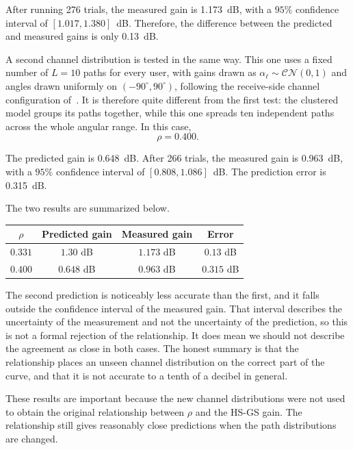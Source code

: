 \documentclass[journal]{IEEEtran}
\newcommand{\CN}{\mathcal{CN}}
\begin{document}
After running 276 trials, the measured gain is 1.173~dB, with a $95\%$
confidence interval of $[1.017,1.380]$~dB. Therefore, the difference between
the predicted and measured gains is only 0.13~dB.

A second channel distribution is tested in the same way. This one uses a fixed
number of $L=10$ paths for every user, with gains drawn as
$\alpha_\ell\sim\CN(0,1)$ and angles drawn uniformly on
$(-90^\circ,90^\circ)$, following the receive-side channel configuration
of~\cite{precoding2408}. It is therefore quite different from the first test:
the clustered model groups its paths together, while this one spreads ten
independent paths across the whole angular range. In this case,
\begin{equation}
\rho=0.400.
\end{equation}

The predicted gain is 0.648~dB. After 266 trials, the measured gain is
0.963~dB, with a $95\%$ confidence interval of $[0.808,1.086]$~dB. The
prediction error is 0.315~dB.

The two results are summarized below.

\begin{center}
\footnotesize
\begin{tabular}{cccc}
\toprule
$\rho$ & Predicted gain & Measured gain & Error \\
\midrule
$0.331$ & $1.30$ dB & $1.173$ dB & $0.13$ dB \\
$0.400$ & $0.648$ dB & $0.963$ dB & $0.315$ dB \\
\bottomrule
\end{tabular}
\end{center}

The second prediction is noticeably less accurate than the first, and it falls
outside the confidence interval of the measured gain. That interval describes
the uncertainty of the measurement and not the uncertainty of the prediction,
so this is not a formal rejection of the relationship. It does mean we should
not describe the agreement as close in both cases. The honest summary is that
the relationship places an unseen channel distribution on the correct part of
the curve, and that it is not accurate to a tenth of a decibel in general.

These results are important because the new channel distributions were not used
to obtain the original relationship between $\rho$ and the HS-GS gain. The
relationship still gives reasonably close predictions when the path
distributions are changed.
\end{document}
